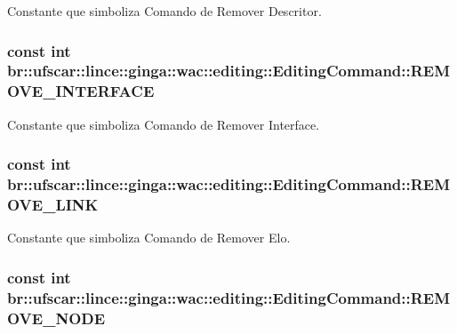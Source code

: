 Constante que simboliza Comando de Remover Descritor. 

\hypertarget{classbr_1_1ufscar_1_1lince_1_1ginga_1_1wac_1_1editing_1_1EditingCommand_ae24a541d10968b24c85b12d5d7fb9542}{
\subsubsection[{REMOVE\_\-INTERFACE}]{\setlength{\rightskip}{0pt plus 5cm}const int {\bf br::ufscar::lince::ginga::wac::editing::EditingCommand::REMOVE\_\-INTERFACE}}}
\label{classbr_1_1ufscar_1_1lince_1_1ginga_1_1wac_1_1editing_1_1EditingCommand_ae24a541d10968b24c85b12d5d7fb9542}


Constante que simboliza Comando de Remover Interface. 

\hypertarget{classbr_1_1ufscar_1_1lince_1_1ginga_1_1wac_1_1editing_1_1EditingCommand_aa2b6da3065dd18818f8ffaa89ea0cd0b}{
\subsubsection[{REMOVE\_\-LINK}]{\setlength{\rightskip}{0pt plus 5cm}const int {\bf br::ufscar::lince::ginga::wac::editing::EditingCommand::REMOVE\_\-LINK}}}
\label{classbr_1_1ufscar_1_1lince_1_1ginga_1_1wac_1_1editing_1_1EditingCommand_aa2b6da3065dd18818f8ffaa89ea0cd0b}


Constante que simboliza Comando de Remover Elo. 

\hypertarget{classbr_1_1ufscar_1_1lince_1_1ginga_1_1wac_1_1editing_1_1EditingCommand_a7071ed34b67f903c7467b272143aec07}{
\subsubsection[{REMOVE\_\-NODE}]{\setlength{\rightskip}{0pt plus 5cm}const int {\bf br::ufscar::lince::ginga::wac::editing::EditingCommand::REMOVE\_\-NODE}}}
\label{classbr_1_1ufscar_1_1lince_1_1ginga_1_1wac_1_1editing_1_1EditingCommand_a7071ed34b67f903c7467b272143aec07}


